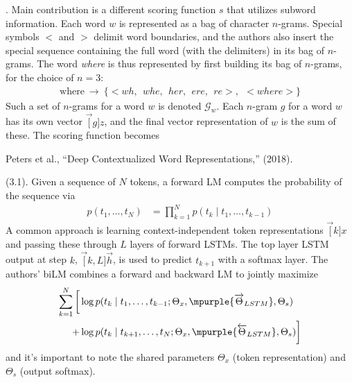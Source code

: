 \documentclass[11pt]{article}
\begin{document}
\myspace
\p {}. Main contribution is a different scoring function $s$ that utilizes subword information. Each word $w$ is represented as a bag of character $n$-grams. Special symbols $<$ and $>$ delimit word boundaries, and the authors also insert the special sequence containing the full word (with the delimiters) in its bag of $n$-grams. The word \textit{where} is thus represented by first building its bag of $n$-grams, for the choice of $n=3$:
\begin{align}
\text{where} ~ \longrightarrow ~  \{    
<wh,~~ whe,~~ her,~~ ere,~~ re>,~~ <where>
\}
\end{align}
Such a set of $n$-grams for a word $w$ is denoted $\mathcal{G}_w$. Each $n$-gram $g$ for a word $w$ has its own vector $\vec[g]{z}$, and the final vector representation of $w$ is the sum of these. The scoring function becomes






\vspace{-1em}
{\footnotesize Peters et al., ``Deep Contextualized Word Representations,'' (2018).}

\p {} (3.1). Given a sequence of $N$ tokens, a forward LM computes the probability of the sequence via
\begin{align}
p(t_1, \ldots, t_N)
&= \prod_{k=1}^{N} p(t_k \mid t_1, \ldots, t_{k-1})
\end{align}
A common approach is learning context-independent token representations $\vec[k]{x}$ and passing these through $L$ layers of forward LSTMs. The top layer LSTM output at step $k$, $\vec[k,L]{\overrightarrow{h}}$, is used to predict $t_{k+1}$ with a softmax layer. The authors' biLM combines a forward and backward LM to jointly maximize 
\begin{align}
\begin{split}
\sum_{k=1}^N \bigg[
&\log p(t_k \mid t_1, \ldots, t_{k-1}; 
\Theta_x, \mpurple{\overrightarrow{\Theta}_{LSTM}}, \Theta_s) \\
+	&\log p(t_k \mid t_{k+1}, \ldots, t_{N}; 
\Theta_x, \mpurple{\overleftarrow{\Theta}_{LSTM}}, \Theta_s) 
\bigg]
\end{split}
\end{align}
and it's important to note the shared parameters $\Theta_x$ (token representation) and $\Theta_s$ (output softmax). 
\end{document}
